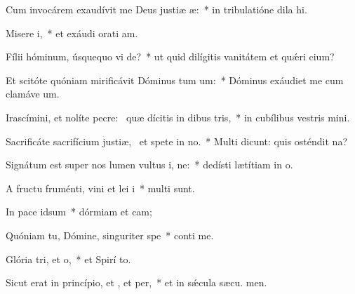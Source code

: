 \item Cum invocárem exaudívit me Deus justiæ æ:~* in tribulatióne dila hi.
\item Misere i,~* et exáudi orati am.
\item Fílii hóminum, úsquequo vi de?~* ut quid dilígitis vanitátem et quǽri cium?
\item Et scitóte quóniam mirificávit Dóminus tum um:~* Dóminus exáudiet me cum clamáve  um.
\item Irascímini, et nolíte pecre:~\pscross{} quæ dícitis in dibus tris,~* in cubílibus vestris mini.
\item Sacrificáte sacrifícium justiæ,~\pscross{} et spete in no.~* Multi dicunt: quis osténdit  na?
\item Signátum est super nos lumen vultus i, ne:~* dedísti lætítiam in  o.
\item A fructu fruménti, vini et lei i~* multi sunt.
\item In pace  idsum~* dórmiam et cam;
\item Quóniam tu, Dómine, singuriter  spe~* conti me.
\item Glória tri, et o,~* et Spirí to.
\item Sicut erat in princípio, et , et per,~* et in sǽcula sæcu. men.
